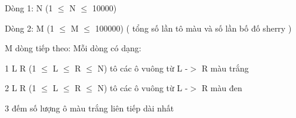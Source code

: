 Dòng 1: N (1  $\le$  N  $\le$  10000)  

   Dòng 2: M (1  $\le$  M  $\le$  100000) ( tổng số lần tô màu và số lần bố đố sherry )  

   M dòng tiếp theo: Mỗi dòng có dạng:  

   1  L  R  (1  $\le$  L  $\le$  R  $\le$  N) tô các ô vuông từ L -$>$ R màu trắng  

   2  L  R  (1  $\le$  L  $\le$  R  $\le$  N) tô các ô vuông từ L -$>$ R màu đen  

   3 đếm số lượng ô màu trắng liên tiếp dài nhất